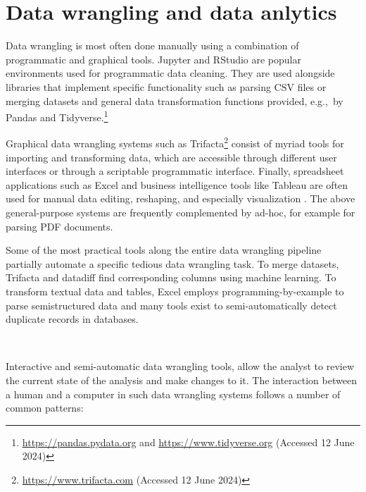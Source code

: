 \documentclass[fleqn,11pt]{report}
\theoremstyle{definition}
\begin{document}
\section{Data wrangling and data anlytics}

Data wrangling is most often done manually using a combination of programmatic and graphical tools.
Jupyter and RStudio are popular environments used for programmatic data cleaning.
They are used alongside libraries that implement specific functionality such as parsing CSV files
or merging datasets \cite{gerrit-2019-csv,sutton-2018-datadiff} and general data transformation
functions provided, e.g.,~by Pandas and Tidyverse.\footnote{\url{https://pandas.pydata.org} and
\url{https://www.tidyverse.org} (Accessed 12 June 2024)}

Graphical data wrangling systems such as Trifacta\footnote{\url{https://www.trifacta.com} (Accessed
12 June 2024)} consist of myriad tools for importing and transforming data, which are accessible
through different user interfaces or through a scriptable programmatic interface.
Finally, spreadsheet applications such as Excel and business intelligence tools like Tableau are
often used for manual data editing, reshaping, and especially
visualization \citep{kandel-2011-research}. The above general-purpose systems are frequently
complemented by ad-hoc, for example for parsing PDF documents.

Some of the most practical tools along the entire data wrangling pipeline partially automate
a specific tedious data wrangling task. To merge datasets, Trifacta and datadiff
\citep{sutton-2018-datadiff} find corresponding columns using machine learning. To transform textual
data and tables, Excel employs programming-by-example to parse semistructured
data and many tools exist to semi-automatically detect duplicate records in databases.

~

Interactive and semi-automatic data wrangling tools, allow the analyst to review
the current state of the analysis and make changes to it. The interaction
between a human and a computer in such data wrangling systems follows a number of common patterns:
\end{document}
